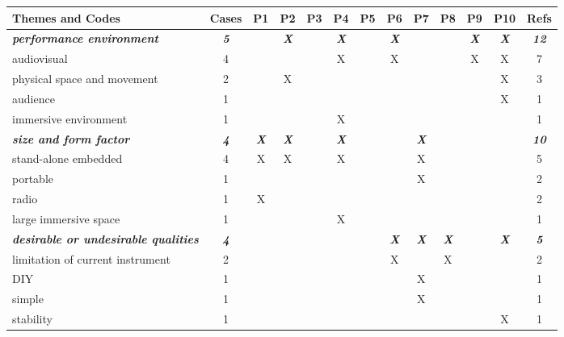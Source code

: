 \documentclass[letterpaper, 12pt]{article}
\begin{document}
\begin{spacing}{1.1}
\begin{longtable}{L{5.3cm}cccccccccccc}
        \textbf{Themes and Codes} & \textbf{Cases} & \textbf{P1} & \textbf{P2} & \textbf{P3} & \textbf{P4} & \textbf{P5} & \textbf{P6} & \textbf{P7} & \textbf{P8} & \textbf{P9} & \textbf{P10} & \textbf{Refs} \\ 
        \hline

        \emph{\textbf{performance environment}} & \emph{\textbf{5}} & & \emph{\textbf{X}} & & \emph{\textbf{X}} & & \emph{\textbf{X}} & & & \emph{\textbf{X}} & \emph{\textbf{X}} & \emph{\textbf{12}} \\
        audiovisual                      & 4  &   &   &   & X &   & X &   &   & X & X & 7  \\
        physical space and movement     & 2  &   & X &   &   &   &   &   &   &   & X & 3  \\
        audience                         & 1  &   &   &   &   &   &   &   &   &   & X & 1  \\
        immersive environment            & 1  &   &   &   & X &   &   &   &   &   &   & 1  \\
        \hline
    
        \emph{\textbf{size and form factor}} & \emph{\textbf{4}} & \emph{\textbf{X}} & \emph{\textbf{X}} & & \emph{\textbf{X}} & & & \emph{\textbf{X}} & & & & \emph{\textbf{10}} \\
        stand-alone embedded             & 4  & X & X &   & X &   &   & X &   &   &   & 5  \\
        portable                         & 1  &   &   &   &   &   &   & X &   &   &   & 2  \\
        radio                            & 1  & X &   &   &   &   &   &   &   &   &   & 2  \\
        large immersive space            & 1  &   &   &   & X &   &   &   &   &   &   & 1  \\
        \hline
    
        \emph{\textbf{desirable or undesirable qualities}} & \emph{\textbf{4}} & & & & & & \emph{\textbf{X}} & \emph{\textbf{X}} & \emph{\textbf{X}} & & \emph{\textbf{X}} & \emph{\textbf{5}} \\
        limitation of current instrument & 2  &   &   &   &   &   & X &   & X &   &   & 2  \\ 
        DIY                              & 1  &   &   &   &   &   &   & X &   &   &   & 1  \\
        simple                           & 1  &   &   &   &   &   &   & X &   &   &   & 1  \\
        stability                        & 1  &   &   &   &   &   &   &   &   &   & X & 1  \\
        \hline
    

\end{longtable}
\end{spacing}
\end{document}
